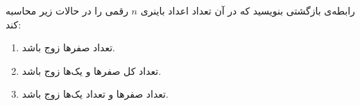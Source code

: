     \p 
رابطه‌ی بازگشتی بنویسید که در آن تعداد اعداد باینری
$n$
رقمی را در حالات زیر محاسبه کند:
\begin{enumerate}
\item
تعداد صفرها زوج باشد.
\item
تعداد کل صفرها و یک‌ها زوج باشد.
\item
تعداد صفرها و تعداد یک‌ها زوج باشد.
\end{enumerate}